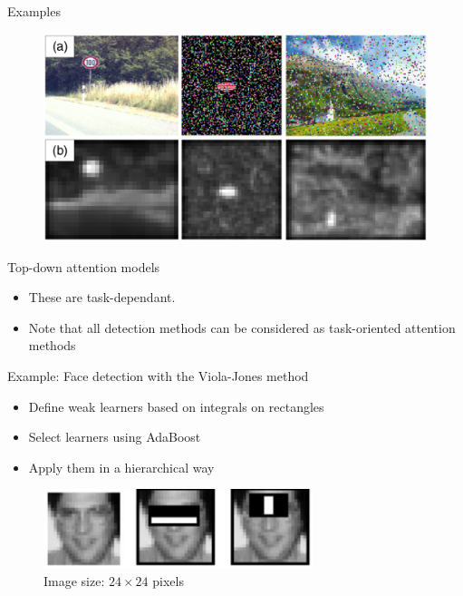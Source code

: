 \documentclass[xcolor=pdftex,dvipsnames,table,mathserif]{beamer}
\begin{document}
\begin{frame}{Examples \cite{itti_model_1998}}

\begin{figure}[ht]
  \centering
  \includegraphics[width=\textwidth]{saliency_maps_itti}
\end{figure}


\end{frame}

\begin{frame}{Top-down attention models}

  \begin{itemize}
  \item These are task-dependant.
  \item Note that all detection methods can be considered as task-oriented attention methods
  \end{itemize}

  \begin{block}{Example: Face detection with the Viola-Jones method~\cite{viola_rapid_2001}}
    \begin{itemize}
    \item Define weak learners based on integrals on rectangles
    \item Select learners using AdaBoost
    \item Apply them in a hierarchical way
    \end{itemize}

\begin{figure}[ht]
  \centering
  \includegraphics[width=0.7\textwidth]{viola_jones_features}\\
  \scriptsize{Image size: $24 \times 24$ pixels}
\end{figure}


  \end{block}

\end{frame}
\end{document}
